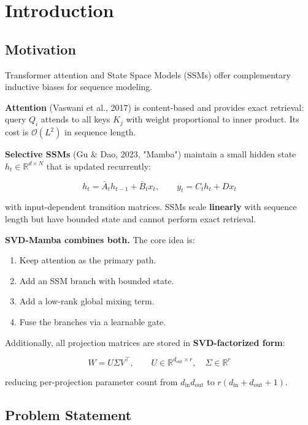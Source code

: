 
\section{Introduction}

\subsection{Motivation}

Transformer attention and State Space Models (SSMs) offer complementary 
inductive biases for sequence modeling.

\textbf{Attention} (Vaswani et al., 2017) is content-based and provides exact 
retrieval: query $Q_i$ attends to all keys $K_j$ with weight proportional 
to inner product. Its cost is $\mathcal{O}(L^2)$ in sequence length.

\textbf{Selective SSMs} (Gu \& Dao, 2023, "Mamba") maintain a small hidden state 
$h_t \in \mathbb{R}^{d \times N}$ that is updated recurrently:

\[
h_t = \bar{A}_t h_{t-1} + \bar{B}_t x_t, \qquad
y_t = C_t h_t + D x_t
\tag{1.1}
\]

with input-dependent transition matrices. SSMs scale \textbf{linearly} with 
sequence length but have bounded state and cannot perform exact retrieval.

\textbf{SVD-Mamba combines both.} The core idea is:

\begin{enumerate}
\item Keep attention as the primary path.
\item Add an SSM branch with bounded state.
\item Add a low-rank global mixing term.
\item Fuse the branches via a learnable gate.

\end{enumerate}
Additionally, all projection matrices are stored in \textbf{SVD-factorized form}:

\[
W = U \Sigma V^\top, \qquad U \in \mathbb{R}^{d_\text{out} \times r}, \quad \Sigma \in \mathbb{R}^r
\tag{1.2}
\]

reducing per-projection parameter count from $d_\text{in} d_\text{out}$ 
to $r(d_\text{in} + d_\text{out} + 1)$.

\subsection{Problem Statement}

